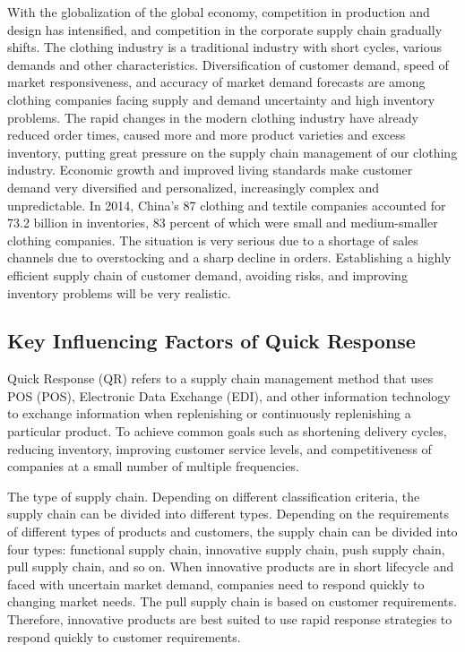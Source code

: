 \documentclass[12pt,]{article}
\begin{document}
With the globalization of the global economy, competition in production
and design has intensified, and competition in the corporate supply
chain gradually shifts. The clothing industry is a traditional industry
with short cycles, various demands and other characteristics.
Diversification of customer demand, speed of market responsiveness, and
accuracy of market demand forecasts are among clothing companies facing
supply and demand uncertainty and high inventory problems. The rapid
changes in the modern clothing industry have already reduced order
times, caused more and more product varieties and excess inventory,
putting great pressure on the supply chain management of our clothing
industry. Economic growth and improved living standards make customer
demand very diversified and personalized, increasingly complex and
unpredictable. In 2014, China's 87 clothing and textile companies
accounted for 73.2 billion in inventories, 83 percent of which were
small and medium-smaller clothing companies. The situation is very
serious due to a shortage of sales channels due to overstocking and a
sharp decline in orders. Establishing a highly efficient supply chain of
customer demand, avoiding risks, and improving inventory problems will
be very realistic.

\hypertarget{key-influencing-factors-of-quick-response}{%
\subsection{Key Influencing Factors of Quick
Response}\label{key-influencing-factors-of-quick-response}}

Quick Response (QR) refers to a supply chain management method that uses
POS (POS), Electronic Data Exchange (EDI), and other information
technology to exchange information when replenishing or continuously
replenishing a particular product. To achieve common goals such as
shortening delivery cycles, reducing inventory, improving customer
service levels, and competitiveness of companies at a small number of
multiple frequencies.

The type of supply chain. Depending on different classification
criteria, the supply chain can be divided into different types.
Depending on the requirements of different types of products and
customers, the supply chain can be divided into four types: functional
supply chain, innovative supply chain, push supply chain, pull supply
chain, and so on. When innovative products are in short lifecycle and
faced with uncertain market demand, companies need to respond quickly to
changing market needs. The pull supply chain is based on customer
requirements. Therefore, innovative products are best suited to use
rapid response strategies to respond quickly to customer requirements.
\end{document}
